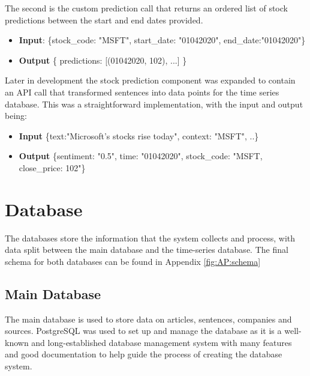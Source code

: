            The second is the custom prediction call that returns an ordered list of stock predictions between the start and end dates provided.
            
            \begin{itemize}
                \item \textbf{Input}: \{stock\_code: "MSFT", start\_date: "01\/04\/2020", end\_date:"01\/04\/2020"\}
                \item \textbf{Output} \{ predictions: [(01\/04\/2020, 102), ...] \}
            \end{itemize}
            
            Later in development the stock prediction component was expanded to contain an API call that transformed sentences into data points for the time series database. This was a straightforward implementation, with the input and output being:
            
            \begin{itemize}
                \item \textbf{Input} \{text:"Microsoft's stocks rise today", context: "MSFT", ..\}
                \item \textbf{Output} \{sentiment: "0.5", time: "01\/04\/2020", stock\_code: "MSFT, close\_price: 102"\}
            \end{itemize}
        
            
    \section{Database}
    The databases store the information that the system collects and process, with data split between the main database and the time-series database. The final schema for both databases can be found in Appendix \ref{fig:AP:schema}  
    
        \subsection{Main Database}
        The main database is used to store data on articles, sentences, companies and sources. PostgreSQL \citep{technology:PostgreSQL} was used to set up and manage the database as it is a well-known and long-established database management system with many features and good documentation to help guide the process of creating the database system. 
        
